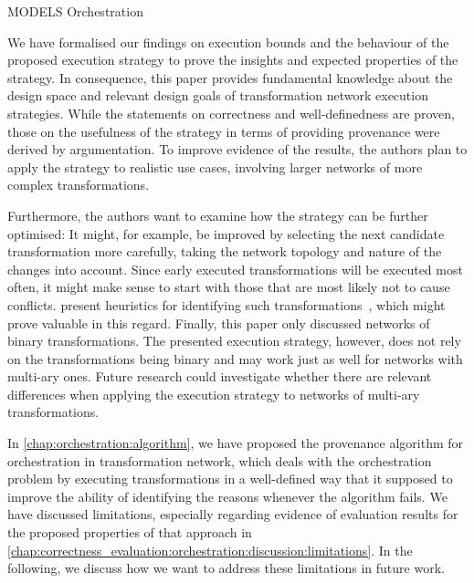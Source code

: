 \begin{copiedFrom}{MODELS Orchestration}

We have formalised our findings on execution bounds and the behaviour of the proposed execution strategy to prove the insights and expected properties of the strategy.
In consequence, this paper provides fundamental knowledge about the design space and relevant design goals of transformation network execution strategies.
While the statements on correctness and well-definedness are proven, those on the usefulness of the strategy in terms of providing provenance were derived by argumentation.
To improve evidence of the results, the authors plan to apply the strategy to realistic use cases, involving larger networks of more complex transformations.

Furthermore, the authors want to examine how the strategy can be further optimised:
It might, for example, be improved by selecting the next candidate transformation more carefully, taking the network topology and nature of the changes into account.
Since early executed transformations will be executed most often, it might make sense to start with those that are most likely not to cause conflicts.
\citeauthor{etien2012Chaining-AMT} present heuristics for identifying such transformations~\cite{etien2010Combining-SAC,etien2012Chaining-AMT}, which might prove valuable in this regard.
%
Finally, this paper only discussed networks of binary transformations.
The presented execution strategy, however, does not rely on the transformations being binary and may work just as well for networks with multi-ary ones.
Future research could investigate whether there are relevant differences when applying the execution strategy to networks of multi-ary transformations.


\end{copiedFrom} %

In \autoref{chap:orchestration:algorithm}, we have proposed the provenance algorithm for orchestration in transformation network, which deals with the orchestration problem by executing transformations in a well-defined way that it supposed to improve the ability of identifying the reasons whenever the algorithm fails.
We have discussed limitations, especially regarding evidence of evaluation results for the proposed properties of that approach in \autoref{chap:correctness_evaluation:orchestration:discussion:limitations}.
In the following, we discuss how we want to address these limitations in future work.

